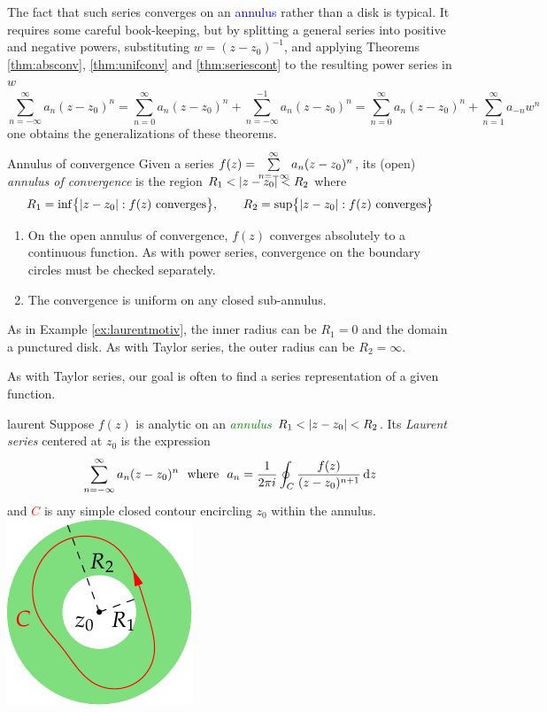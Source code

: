 The fact that such series converges on an \textcolor{blue}{annulus} rather than a disk is typical. It requires some careful book-keeping, but by splitting a general series into positive and negative powers, substituting $w=(z-z_0)^{-1}$, and applying Theorems \ref{thm:absconv}, \ref{thm:unifconv} and \ref{thm:seriescont} to the resulting power series in $w$
\[
	\sum\limits_{n=-\infty}^{\infty} a_n(z-z_0)^n=\sum\limits_{n=0}^{\infty} a_n(z-z_0)^n+\sum\limits_{n=-\infty}^{-1} a_n(z-z_0)^n
	=\sum\limits_{n=0}^{\infty} a_n(z-z_0)^n +\sum\limits_{n=1}^\infty a_{-n}w^n
\]
one obtains the generalizations of these theorems.

\begin{thm}{Annulus of convergence}{}
	Given a series $\smash[b]{f(z)=\sum\limits_{n=-\infty}^{\smash{\infty}} a_n(z-z_0)^n}$, its (open) \emph{annulus of convergence} is the region $R_1<\left| z-z_0\right|<R_2$ where
	\[
		R_1=\inf\bigl\{\left| z-z_0\right|:f(z)\text{ converges}\bigr\},\qquad 
		R_2=\sup\bigl\{\left| z-z_0\right|:f(z)\text{ converges}\bigr\}
	\]
	\begin{enumerate}
	  \item On the open annulus of convergence, $f(z)$ converges absolutely to a continuous function. As with power series, convergence on the boundary circles must be checked separately.
	  \item The convergence is uniform on any closed sub-annulus.
	\end{enumerate}
\end{thm}

As in Example \ref{ex:laurentmotiv}, the inner radius can be $R_1=0$ and the domain a punctured disk. As with Taylor series, the outer radius can be $R_2=\infty$.\smallbreak

\goodbreak

As with Taylor series, our goal is often to find a series representation of a given function.

\begin{defn}[lower separated=false, sidebyside, sidebyside align=top seam, sidebyside gap=0pt, righthand width=0.25\linewidth]{}{laurent}
	Suppose $f(z)$ is analytic on an \textcolor{Green}{\emph{annulus}} $R_1<\left| z-z_0\right|<R_2$. Its \emph{Laurent series} centered at $z_0$ is the expression
	\[
		\sum_{n=-\infty}^\infty a_n(z-z_0)^n
		\ \text{ where }\ 
		a_n=\frac 1{2\pi i}\oint_C\frac{f(z)}{(z-z_0)^{n+1}}\,\dz
	\]
	and \textcolor{red}{$C$} is any simple closed contour encircling $z_0$ within the annulus.
	\tcblower
	\flushright\includegraphics[scale=0.95]{laurent2}
\end{defn}


